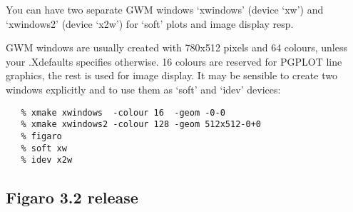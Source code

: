    You can have two separate GWM windows `xwindows' (device `xw') and
   `xwindows2' (device `x2w') for `soft' plots and image display resp.

   GWM windows are usually created with 780x512 pixels and 64 colours,
   unless your .Xdefaults specifies otherwise. 16 colours are reserved
   for PGPLOT line graphics, the rest is used for image display. It may
   be sensible to create two windows explicitly and to use them as
   `soft' and `idev' devices:

\begin{verbatim}
   % xmake xwindows  -colour 16  -geom -0-0
   % xmake xwindows2 -colour 128 -geom 512x512-0+0
   % figaro
   % soft xw
   % idev x2w
\end{verbatim}


\subsection{\label{news32}Figaro 3.2 release}


